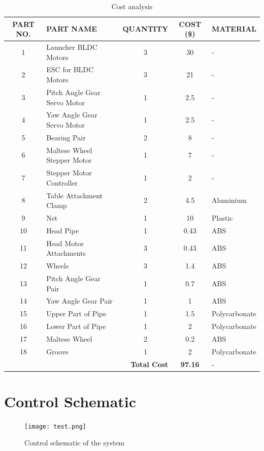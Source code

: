 \documentclass[12pt]{report}
\begin{document}
\begin{appendices}
\begin{table}[H]
\centering
\begin{tabular}{|c|l|c|c|l|}
\hline
\textbf{PART NO.} & \textbf{PART NAME}            & \textbf{QUANTITY} & \textbf{COST (\$)} & \textbf{MATERIAL}      \\ \hline
1  & Launcher BLDC Motors       & 3 & 30    & -                  \\ \hline
2  & ESC for BLDC Motors        & 3 & 21    & -                  \\ \hline
3  & Pitch Angle Gear Servo Motor & 1 & 2.5   & -                  \\ \hline
4  & Yaw Angle Gear Servo Motor & 1 & 2.5   & -                  \\ \hline
5  & Bearing Pair               & 2 & 8     & -                  \\ \hline
6  & Maltese Wheel Stepper Motor & 1 & 7     & -                  \\ \hline
7  & Stepper Motor Controller   & 1 & 2     & -                  \\ \hline
8  & Table Attachment Clamp     & 2 & 4.5   & Aluminium                  \\ \hline
9  & Net                        & 1 & 10    & Plastic                  \\ \hline
10 & Head Pipe                  & 1 & 0.43  & ABS                \\ \hline
11 & Head Motor Attachments     & 3 & 0.43  & ABS                \\ \hline
12 & Wheels                     & 3 & 1.4   & ABS                \\ \hline
13 & Pitch Angle Gear Pair      & 1 & 0.7   & ABS                \\ \hline
14 & Yaw Angle Gear Pair        & 1 & 1     & ABS                \\ \hline
15 & Upper Part of Pipe         & 1 & 1.5   & Polycarbonate      \\ \hline
16 & Lower Part of Pipe         & 1 & 2     & Polycarbonate      \\ \hline
17 & Maltese Wheel              & 2 & 0.2   & ABS                \\ \hline
18 & Groove                     & 1 & 2     & Polycarbonate      \\ \hline
\multicolumn{3}{|r|}{\textbf{Total Cost}} & \textbf{97.16} & - \\ \hline
\end{tabular}
\caption{Cost analysis}
\end{table}

\section{Control Schematic}
\begin{figure}[H]
    \centering
    \texttt{[image: test.png]} 
    \caption{Control schematic of the system}
    \label{fig:control-scheme}
\end{figure}


\end{appendices}
\end{document}
